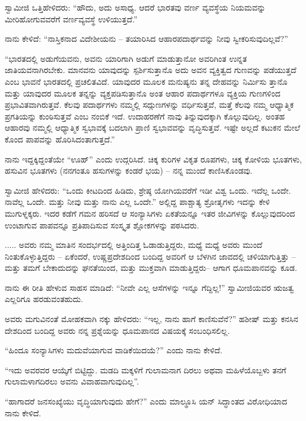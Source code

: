 ಸ್ವಾಮೀಜಿ ಒತ್ತಿಹೇಳಿದರು: “ಹೌದು, ಅದು ಅಸಾಧ್ಯ. ಆದರೆ ಭಾರತವು ವರ್ಣ ವ್ಯವಸ್ಥೆಯ ನಿಯಮವನ್ನು ಮೀರಿಹೋಗುವವರೆಗೆ ವರ್ಣವ್ಯವಸ್ಥೆ ಉಳಿಯುತ್ತದೆ.”

ನಾನು ಕೇಳಿದೆ: “ನಾಸ್ತಿಕನಾದ ವಿದೇಶೀಯನು – ತಯಾರಿಸಿದ ಆಹಾರಪದಾರ್ಥವನ್ನು ನೀವು ಸ್ವೀಕರಿಸುವುದಿಲ್ಲವೆ?”

“ಭಾರತದಲ್ಲಿ ಅಡುಗೆಯವನು, ಅವನು ಯಾರಿಗಾಗಿ ಅಡುಗೆ ಮಾಡುತ್ತಾನೋ ಅವರಿಗಿಂತ ಉನ್ನತ ಜಾತಿಯವನಾಗಿರಬೇಕು. ಮಾನವನು ಯಾವುದನ್ನು ಸ್ಪರ್ಶಿಸುತ್ತಾನೊ ಅದು ಅವನ ವ್ಯಕ್ತಿತ್ವದ ಗುಣವನ್ನು ಪಡೆಯುತ್ತದೆ ಎಂಬ ಭಾವನೆ ಭಾರತದಲ್ಲಿ ಪ್ರಚಲಿತವಿದೆ. ಯಾವುದರ ಮೂಲಕ ಮನುಷ್ಯನು ತನ್ನ ದೇಹವನ್ನು ನಿರ್ಮಿಸು ತ್ತಾನೊ ಮತ್ತು ಯಾವುದರ ಮೂಲಕ ತನ್ನನ್ನು ವ್ಯಕ್ತಪಡಿಸುತ್ತಾನೊ ಅಂತ ಆಹಾರ ಪದಾರ್ಥಗಳೂ ವ್ಯಕ್ತಿಯ ಗುಣಗಳಿಂದ ಪ್ರಭಾವಿತವಾಗಿರುತ್ತವೆ. ಕೆಲವು ಪದಾರ್ಥಗಳು ನಮ್ಮಲ್ಲಿ ಸದ್ಗುಣಗಳನ್ನು ವರ್ಧಿಸುತ್ತವೆ, ಮತ್ತೆ ಕೆಲವು ನಮ್ಮ ಆಧ್ಯಾತ್ಮಿಕ ಪ್ರಗತಿಯನ್ನು ಕುಂಠಿಸುತ್ತವೆ ಎಂಬ ನಂಬಿಕೆ ಇದೆ. ಉದಾಹರಣೆಗೆ ನಾವು ತಿನ್ನುವುದಕ್ಕಾಗಿ ಕೊಲ್ಲುವುದಿಲ್ಲ. ಅಂತಹ ಆಹಾರವು ನಮ್ಮಲ್ಲಿ ಆಧ್ಯಾತ್ಮಿಕ ಸ್ವಭಾವಕ್ಕೆ ಬದಲಾಗಿ ಪ್ರಾಣಿ ಸ್ವಭಾವವನ್ನು ವೃದ್ಧಿಸುತ್ತವೆ. ಇಷ್ಟೇ ಅಲ್ಲದೆ ಕಟುಕನ ಮೇಲೆ ಕೊಂದ ಪಾಪವನ್ನು ಹೊರಿಸಿದಂತಾಗುತ್ತದೆ.”

ನಾನು ಇದ್ದಕ್ಕಿದ್ದಂತೆಯೇ “ಊಹ್” ಎಂದು ಉದ್ಗರಿಸಿದೆ. ಚಿಕ್ಕ ಕುರಿಗಳ ವಿಕೃತ ರೂಪಗಳು, ಚಿಕ್ಕ ಕೋಳಿಯ ಭೂತಗಳು, ಹಸುವಿನ ಭೂತಗಳು (ನನಗಂತೂ ಹಸುಗಳನ್ನು ಕಂಡರೆ ಭಯ) – ನನ್ನ ಮುಂದೆ ಕಾಣಿಸಿಕೊಂಡವು.

ಸ್ವಾಮೀಜಿ ಹೇಳಿದರು: “ಒಂದು ಕೀಟದಿಂದ ಹಿಡಿದು, ಶ್ರೇಷ್ಠ ಯೋಗಿಯವರೆಗೆ ಇಡೀ ವಿಶ್ವ ಒಂದು. ಇದೆಲ್ಲ ಒಂದೇ. ನಾವೆಲ್ಲ ಒಂದೇ. ಮತ್ತು ನೀವು ಮತ್ತು ನಾನು ಎಲ್ಲ ಒಂದೇ.” ಅಲ್ಲಿದ್ದ ಪಾಶ್ಚಾತ್ಯ ಶ್ರೋತೃಗಳು ಇದನ್ನು ಕೇಳಿ ಮುಗುಳ್ನಕ್ಕರು. ಇದರ ಕಡೆಗೆ ಗಮನ ಹರಿಸದೆ ಆ ಸಂನ್ಯಾಸಿಗಳು ಏಕತೆಯನ್ನೂ ಇತರ ಜೀವಿಗಳನ್ನು ಕೊಲ್ಲುವುದರಿಂದ ಉಂಟಾಗುವ ಪಾಪವನ್ನೂ ಪ್ರತಿಪಾದಿಸುವ ಸಂಸ್ಕೃತ ಶ್ಲೋಕಗಳನ್ನು ಪಠಸಿದರು.

..... ಅವರು ನಮ್ಮ ಮಾತಿನ ಸಂದರ್ಭದಲ್ಲಿ ಅತ್ತಿಂದಿತ್ತ ಓಡಾಡುತ್ತಿದ್ದರು, ಮಧ್ಯೆ ಮಧ್ಯೆ ಅವರು  ಮುಂದೆ ನಿಂತುಕೊಳ್ಳುತ್ತಿದ್ದರು – ಏಕೆಂದರೆ, ಉಷ್ಣಪ್ರದೇಶದಿಂದ ಬಂದಿದ್ದ ಅವರಿಗೆ ಆ ಬೆಳಗಿನ ಜಾವದಲ್ಲಿ ಚಳಿಯಾಗುತ್ತಿತ್ತು – ಮತ್ತು ತಮಗೆ ಬೇಕಾದುದನ್ನು ಘನತೆಯಿಂದ, ಮತ್ತು ಮುಕ್ತವಾಗಿ ಮಾಡುತ್ತಿದ್ದರು– ಆಗಾಗ ಧೂಮಪಾನವನ್ನು ಕೂಡ.

ನಾನು ಈ ರೀತಿ ಹೇಳುವ ಸಾಹಸ ಮಾಡಿದೆ: “ನೀವೇ ಎಲ್ಲ ಆಸೆಗಳನ್ನು ಇನ್ನೂ ಗೆದ್ದಿಲ್ಲ!” ಸ್ವಾಮೀಜಿಯವರ ಋಜತ್ವ ಎಲ್ಲರಿಗೂ ಹರಡುವಂತಹುದು.

ಅವರು ಮಗುವಿನಂತೆ ಮೋಹಕವಾಗಿ ನಕ್ಕು ಹೇಳಿದರು: “ಇಲ್ಲ, ನಾನು ಹಾಗೆ ಕಾಣಿಸುವೆನೆ?” ಹಶೀಷ್ ಮತ್ತು ಕನಸಿನ ದೇಶದಿಂದ ಬಂದಿದ್ದ ಅವರು ನನ್ನ ಪ್ರಶ್ನೆಯನ್ನು ಧೂಮಪಾನದ ವಿಷಯಕ್ಕೆ ಸಂಬಂಧಿಸಲಿಲ್ಲ.

“ಹಿಂದೂ ಸಂನ್ಯಾಸಿಗಳು ಮದುವೆಯಾಗುವ ವಾಡಿಕೆಯಿದಯೆ?” ಎಂದು ನಾನು ಕೇಳಿದೆ.

“ಇದು ಅವರವರ ಆಯ್ಕೆಗೆ ಬಿಟ್ಟಿದ್ದು. ಮಡದಿ ಮಕ್ಕಳಿಗೆ ಗುಲಾಮನಾಗ ದಿರಲು ಅಥವಾ ಮಹಿಳೆಯೊಬ್ಬಳು ತನಗೆ ಗುಲಾಮಳಾಗದಿರಲು ಅವನು ವಿವಾಹವಾಗುವುದಿಲ್ಲ”.

“ಹಾಗಾದರೆ ಜನಸಂಖ್ಯೆಯು ವೃದ್ಧಿಯಾಗುವುದು ಹೇಗೆ?” ಎಂದು ಮಾಲ್ಥೂಸಿ ಯನ್ ಸಿದ್ಧಾಂತದ ವಿರೋಧಿಯಾದ ನಾನು ಕೇಳಿದೆ.

